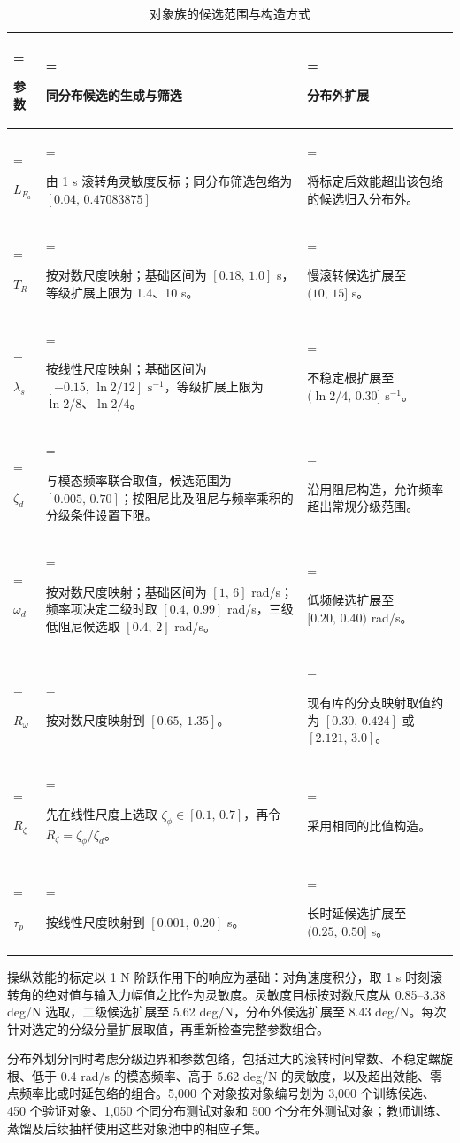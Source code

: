 \documentclass[UTF8,a4paper,11pt,fontset=fandol,scheme=plain]{ctexart}
\begin{document}
\begin{table}[!htbp]\centering
\hypertarget{sampling-protocol-table}{}\label{sampling-protocol-table}
\caption{对象族的候选范围与构造方式}
\small\setlength{\tabcolsep}{4pt}\renewcommand{\arraystretch}{1.18}
\begin{tabularx}{\linewidth}{>{\hsize=0.42\hsize\linewidth=\hsize\raggedright\arraybackslash}X>{\hsize=1.62\hsize\linewidth=\hsize\raggedright\arraybackslash}X>{\hsize=0.96\hsize\linewidth=\hsize\raggedright\arraybackslash}X}\toprule
参数 & 同分布候选的生成与筛选 & 分布外扩展 \\
\midrule
\(L_{F_a}\) & 由 1 s 滚转角灵敏度反标；同分布筛选包络为 \([0.04,\,0.47083875]\) & 将标定后效能超出该包络的候选归入分布外。 \\
\(T_R\) & 按对数尺度映射；基础区间为 \([0.18,\,1.0]\) s，等级扩展上限为 1.4、10 s。 & 慢滚转候选扩展至 \((10,\,15]\) s。 \\
\(\lambda_s\) & 按线性尺度映射；基础区间为 \([-0.15,\,\ln 2/12]\) \(\mathrm{s}^{-1}\)，等级扩展上限为 \(\ln 2/8\)、\(\ln 2/4\)。 & 不稳定根扩展至 \((\ln 2/4,\,0.30]\) \(\mathrm{s}^{-1}\)。 \\
\(\zeta_d\) & 与模态频率联合取值，候选范围为 \([0.005,\,0.70]\)；按阻尼比及阻尼与频率乘积的分级条件设置下限。 & 沿用阻尼构造，允许频率超出常规分级范围。 \\
\(\omega_d\) & 按对数尺度映射；基础区间为 \([1,\,6]\) rad/s；频率项决定二级时取 \([0.4,\,0.99]\) rad/s，三级低阻尼候选取 \([0.4,\,2]\) rad/s。 & 低频候选扩展至 \([0.20,\,0.40)\) rad/s。 \\
\(R_\omega\) & 按对数尺度映射到 \([0.65,\,1.35]\)。 & 现有库的分支映射取值约为 \([0.30,\,0.424]\) 或 \([2.121,\,3.0]\)。 \\
\(R_\zeta\) & 先在线性尺度上选取 \(\zeta_\phi\in[0.1,\,0.7]\)，再令 \(R_\zeta=\zeta_\phi/\zeta_d\)。 & 采用相同的比值构造。 \\
\(\tau_p\) & 按线性尺度映射到 \([0.001,\,0.20]\) s。 & 长时延候选扩展至 \((0.25,\,0.50]\) s。 \\
\bottomrule\end{tabularx}\end{table}
\hypertarget{gain-calibration-protocol}{}\label{gain-calibration-protocol}
操纵效能的标定以 1 N 阶跃作用下的响应为基础：对角速度积分，取 1 s 时刻滚转角的绝对值与输入力幅值之比作为灵敏度。灵敏度目标按对数尺度从 0.85–3.38 deg/N 选取，二级候选扩展至 5.62 deg/N，分布外候选扩展至 8.43 deg/N。每次针对选定的分级分量扩展取值，再重新检查完整参数组合。

\hypertarget{ood-generation-protocol}{}\label{ood-generation-protocol}
分布外划分同时考虑分级边界和参数包络，包括过大的滚转时间常数、不稳定螺旋根、低于 0.4 rad/s 的模态频率、高于 5.62 deg/N 的灵敏度，以及超出效能、零点频率比或时延包络的组合。5,000 个对象按对象编号划为 3,000 个训练候选、450 个验证对象、1,050 个同分布测试对象和 500 个分布外测试对象；教师训练、蒸馏及后续抽样使用这些对象池中的相应子集。
\end{document}
